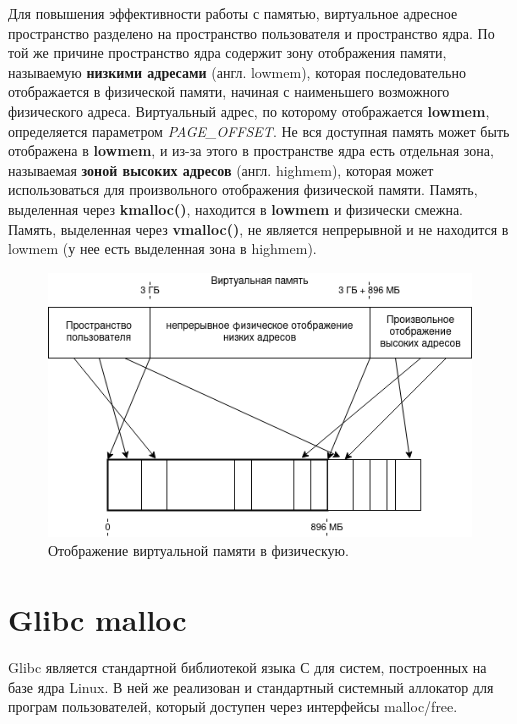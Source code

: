 Для повышения эффективности работы с памятью, виртуальное адресное пространство разделено на пространство пользователя и пространство ядра. По той же причине пространство ядра содержит зону отображения памяти, называемую \textbf{низкими адресами} (англ. lowmem), которая последовательно отображается в физической памяти, начиная с наименьшего возможного физического адреса. Виртуальный адрес, по которому отображается \textbf{lowmem}, определяется параметром \textit{PAGE\_OFFSET}. Не вся доступная память может быть отображена в \textbf{lowmem}, и из-за этого в пространстве ядра есть отдельная зона, называемая \textbf{зоной высоких адресов} (англ. highmem), которая может использоваться для произвольного отображения физической памяти. Память, выделенная через \textbf{kmalloc()}, находится в \textbf{lowmem} и физически смежна. Память, выделенная через \textbf{vmalloc()}, не является непрерывной и не находится в lowmem (у нее есть выделенная зона в highmem).\cite{memory-mapping}

\begin{figure}[!h]
	\begin{center}
		\includegraphics[scale=0.6]{images/virtual-memory.png}
		\caption{Отображение виртуальной памяти в физическую.}
		\label{virtual-memory}
	\end{center}
\end{figure}

\section{Glibc malloc}
Glibc является стандартной библиотекой языка С для систем, построенных на базе ядра Linux. В ней же реализован и стандартный системный аллокатор для програм пользователей, который доступен через интерфейсы malloc/free.

